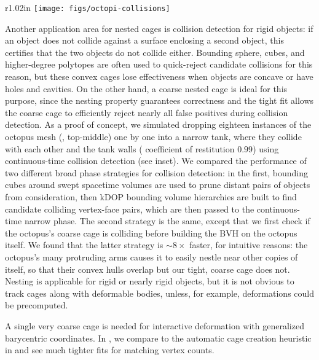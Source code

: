 %
\begin{wrapfigure}{r}{1.02in}
%
\centering
%
\texttt{[image: figs/octopi-collisions]}
%
\end{wrapfigure}
%
Another application area for nested cages is collision detection for rigid
objects: if an object does not collide against a surface enclosing a second
object, 
this certifies that the two objects do not collide either.
%
Bounding sphere, cubes, and
higher-degree polytopes are often used to quick-reject candidate collisions for
this reason, but these convex cages lose effectiveness when objects are concave
or have holes and cavities. On the other hand, a coarse nested cage is ideal
for this purpose, since the nesting property guarantees correctness and the
tight fit allows the coarse cage to efficiently reject nearly all false
positives during collision detection. As a proof of concept, we simulated
dropping eighteen instances of the octopus mesh (,
top-middle) one by one into a narrow tank, where they collide with each other
and the tank walls ( coefficient of restitution $0.99$) using
continuous-time collision detection (see inset). We compared the performance of
two different broad phase strategies for collision detection: in the first,
bounding cubes around swept spacetime volumes are used to prune distant pairs
of objects from consideration, then kDOP bounding volume hierarchies are built
to find candidate colliding vertex-face pairs, which are then passed to the
continuous-time narrow phase. The second strategy is the same, except
that we first check if the octopus's coarse cage is colliding before building
the BVH on the octopus itself. We found that the latter strategy is 
$\sim 8\times$ faster, for intuitive reasons: the octopus's many
protruding arms causes it to easily nestle near other copies of itself, so that
their convex hulls overlap but our tight, coarse cage does not.
%
Nesting is applicable for rigid or nearly rigid objects, but it is not obvious
to track cages along with deformable bodies, unless, for example, deformations
could be precomputed.

A single very coarse cage is needed for interactive deformation with
generalized barycentric coordinates.
%
In , we compare to the automatic cage creation
heuristic in \cite{Ben-Chen:2009:SDT} and see much tighter fits for matching
vertex counts.

